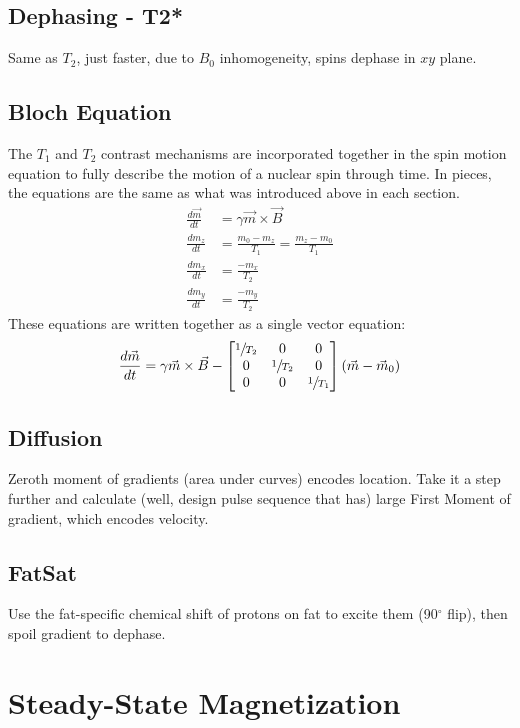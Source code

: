 
\subsection{Dephasing - T2*}
Same as $T_2$, just faster, due to $B_0$ inhomogeneity, spins dephase in $xy$ plane.
\subsection{Bloch Equation}
The $T_1$ and $T_2$ contrast mechanisms are incorporated together in the spin motion equation to fully describe the motion of a nuclear spin through time. In pieces, the equations are the same as what was introduced above in each section.
\begin{align}
\frac{d\vec{m}}{dt} &= \gamma \vec{m} \times \vec{B}  \\
\frac{dm_z}{dt}&= \frac{m_0-m_z}{T_1} =\frac{m_z-m_0}{T_1} \\
\frac{dm_{x}}{dt}&= \frac{-m_{x}}{T_2}  \\
\frac{dm_{y}}{dt}&= \frac{-m_{y}}{T_2}
\end{align}
These equations are written together as a single vector equation:
\begin{equation}
\frac{d\vec{m}}{dt} = \gamma \vec{m} \times \vec{B} -\left[\begin{matrix}\sfrac{1}{T_2}&0&0\\0&\sfrac{1}{T_2}&0\\0&0&\sfrac{1}{T_1}\end{matrix}\right] \left(\vec{m}-\vec{m}_0\right)
\end{equation}
\subsection{Diffusion}
Zeroth moment of gradients (area under curves) encodes location. Take it a step further and calculate (well, design pulse sequence that has) large First Moment of gradient, which encodes velocity. 
\subsection{FatSat}
Use the fat-specific chemical shift of protons on fat to excite them (90$^\circ$ flip), then spoil gradient to dephase.
\section{Steady-State Magnetization}

